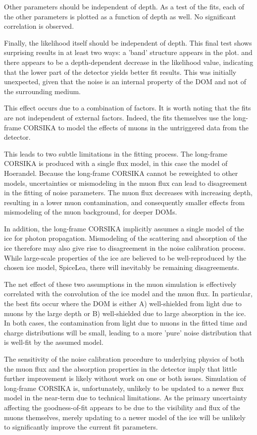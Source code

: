 Other parameters should be independent of depth.
As a test of the fits, each of the other parameters is plotted as a function of depth as well.
No significant correlation is observed.

Finally, the likelihood itself should be independent of depth.
This final test shows surprising results in at least two ways:
a 'band' structure appears in the plot. and there appears to be a depth-dependent decrease in the likelihood value, indicating that the lower part of the detector yields better fit results.
This was initially unexpected, given that the noise is an internal property of the DOM and not of the surrounding medium.

This effect occurs due to a combination of factors. 
It is worth noting that the fits are not independent of external factors.
Indeed, the fits themselves use the long-frame CORSIKA to model the effects of muons in the untriggered data from the detector.

This leads to two subtle limitations in the fitting process.
The long-frame CORSIKA is produced with a single flux model, in this case the model of Hoerandel.
Because the long-frame CORSIKA cannot be reweighted to other models, uncertainties or mismodeling in the muon flux can lead to disagreement in the fitting of noise parameters.
The muon flux decreases with increasing depth, resulting in a lower muon contamination, and consequently smaller effects from mismodeling of the muon background, for deeper DOMs. 

In addition, the long-frame CORSIKA implicitly assumes a single model of the ice for photon propagation.
Mismodeling of the scattering and absorption of the ice therefore may also give rise to disagreement in the noise calibration process.
While large-scale properties of the ice are believed to be well-reproduced by the chosen ice model, SpiceLea, there will inevitably be remaining disagreements.

The net effect of these two assumptions in the muon simulation is effectively correlated with the convolution of the ice model and the muon flux.
In particular, the best fits occur where the DOM is either A) well-shielded from light due to muons by the large depth or B) well-shielded due to large absorption in the ice.
In both cases, the contamination from light due to muons in the fitted time and charge distributions will be small, leading to a more 'pure' noise distribution that is well-fit by the assumed model.

The sensitivity of the noise calibration procedure to underlying physics of both the muon flux and the absorption properties in the detector imply that little further improvement is likely without work on one or both issues.
Simulation of long-frame CORSIKA is, unfortunately, unlikely to be updated to a newer flux model in the near-term due to technical limitations.
As the primary uncertainty affecting the goodness-of-fit appears to be due to the visibility and flux of the muons themselves, merely updating to a newer model of the ice will be unlikely to significantly improve the current fit parameters.

